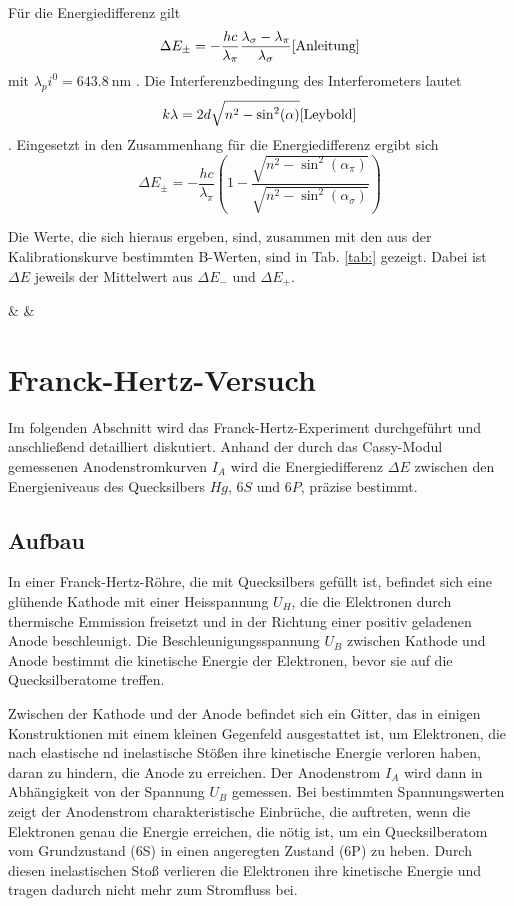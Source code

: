 \documentclass{article}
\begin{document}
\begin{multicols}{2}
Für die Energiedifferenz gilt
\[
  \Delta E_\pm = -\frac{h c}{\lambda_\pi} \frac{\lambda_\sigma - \lambda_\pi}{\lambda_\sigma} \cite{Anleitung}
\]
mit $\lambda_pi^0 = \SI{643.8}{\nm}$ \cite{Leybold}. Die Interferenzbedingung des Interferometers lautet
\[
  k\lambda = 2d\sqrt{n^2 - \sin^2(\alpha)} \cite{Leybold}
\].
Eingesetzt in den Zusammenhang für die Energiedifferenz ergibt sich
\[
  \Delta E_\pm = -\frac{h c}{\lambda_\pi} (1 - \frac{\sqrt{n^2-\sin^2(\alpha_\pi)}}{\sqrt{n^2-\sin^2(\alpha_\sigma)}})
\]

Die Werte, die sich hieraus ergeben, sind, zusammen mit den aus der Kalibrationskurve bestimmten B-Werten, sind in Tab. \ref{tab:} gezeigt.
Dabei ist $\Delta E$ jeweils der Mittelwert aus $\Delta E_-$ und $\Delta E_+$.

\begin{table}
  \centering
  {\csvcoli & \csvcolii & \csvcoliii}
  
\end{table}

\clearpage
\section{Franck-Hertz-Versuch}
Im folgenden Abschnitt wird das Franck-Hertz-Experiment durchgeführt und anschließend detailliert 
diskutiert. Anhand der durch das Cassy-Modul gemessenen Anodenstromkurven \( I_A \) wird die 
Energiedifferenz \( \Delta E \) zwischen den Energieniveaus des Quecksilbers $Hg$, \( 6S \) und \( 6P \), 
präzise bestimmt.
\subsection{Aufbau}
In einer Franck-Hertz-Röhre, die mit Quecksilbers gefüllt ist, befindet sich eine glühende 
Kathode mit einer Heisspannung $U_H$, die die Elektronen durch thermische Emmission freisetzt und in der 
Richtung einer positiv geladenen Anode beschleunigt. Die Beschleunigungsspannung $U_B$ zwischen Kathode 
und Anode bestimmt die kinetische Energie der Elektronen, bevor sie auf die Quecksilberatome treffen.

Zwischen der Kathode und der Anode befindet sich ein Gitter, das in einigen Konstruktionen mit einem kleinen 
Gegenfeld ausgestattet ist, um Elektronen, die nach elastische nd inelastische Stößen ihre kinetische Energie 
verloren haben, daran zu hindern, die Anode zu erreichen. Der Anodenstrom $I_A$
wird dann in Abhängigkeit von der Spannung $U_B$ gemessen. Bei bestimmten Spannungswerten zeigt der Anodenstrom charakteristische Einbrüche, die auftreten, wenn die Elektronen genau die Energie erreichen, die nötig ist, um ein Quecksilberatom vom Grundzustand (6S) in einen angeregten Zustand (6P) zu heben.
 Durch diesen inelastischen Stoß verlieren die Elektronen ihre kinetische Energie und tragen dadurch nicht mehr zum Stromfluss bei.


\end{multicols}
\end{document}
